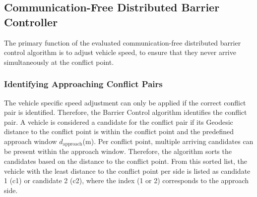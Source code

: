

\subsection{Communication-Free Distributed Barrier Controller}
\label{Barrier based vehicle controller}
The primary function of the evaluated communication-free distributed barrier control algorithm is to adjust vehicle speed, to ensure that they never arrive simultaneously at the conflict point. 

\subsubsection{Identifying Approaching Conflict Pairs}
\label{Conflict Pair Identification}
The vehicle specific speed adjustment can only be applied if the correct conflict pair is identified. Therefore, the Barrier Control algorithm identifies the conflict pair. A vehicle is considered a candidate for the conflict pair if its Geodesic distance to the conflict point is within the conflict point and the predefined approach window \(d_\text{approach}\)(m). Per conflict point, multiple arriving candidates can be present within the approach window. Therefore, the algorithm sorts the candidates based on the distance to the conflict point. From this sorted list, the vehicle with the least distance to the conflict point per side is listed as candidate 1 (c1) or candidate 2 (c2), where the index (1 or 2) corresponds to the approach side.

